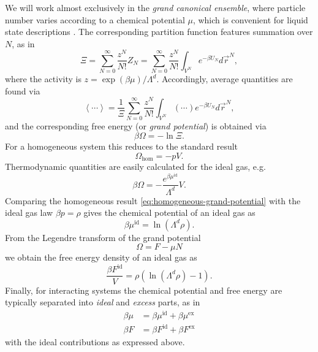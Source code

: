 We will work almost exclusively in the \emph{grand canonical ensemble}, where particle number varies according to a chemical potential $\mu$, which is convenient for liquid state descriptions%
.
The corresponding partition function features summation over $N$, as in
\begin{equation}\label{eq:grand-canonical-partition}
  \Xi
  =
  \sum_{N=0}^\infty \frac{z^N}{N!} Z_N
  =
  \sum_{N=0}^\infty \frac{z^N}{N!}
  \int_{V^N} e^{-\beta U_N} d\vec{r}^N,
\end{equation}
where the activity is $z = \exp{(\beta\mu)} / \Lambda^d$.
Accordingly, average quantities are found via
\begin{equation}\label{eq:grand-canonical-average}
  \left< \cdots \right>
  =
  \frac{1}{\Xi} \sum_{N=0}^\infty \frac{z^N}{N!}
  \int_{V^N} \left(\cdots\right) e^{-\beta U_N} d\vec{r}^N,
\end{equation}
and the corresponding free energy (or \emph{grand potential}) is obtained via
\begin{equation*}
  \beta \Omega = -\ln{\Xi}.
\end{equation*}
For a homogeneous system this reduces to the standard result
\begin{equation}\label{eq:homogeneous-grand-potential}
  \Omega_\mathrm{hom} = - p V.
\end{equation}
Thermodynamic quantities are easily calculated for the ideal gas, e.g.\
\begin{equation*}
  \beta\Omega = - \frac{e^{\beta\mu^\mathrm{id}}}{\Lambda^d} V.
\end{equation*}
Comparing the homogeneous result \eqref{eq:homogeneous-grand-potential} with the ideal gas law $\beta p = \rho$ gives the chemical potential of an ideal gas as
\begin{equation}\label{eq:ideal-chemical-potential}
  \beta \mu^\mathrm{id} = \ln{(\Lambda^d \rho)}.
\end{equation}
From the Legendre transform of the grand potential
\begin{equation}\label{eq:grand-potential-legendre-transform}
  \Omega = F - \mu N
\end{equation}
we obtain the free energy density of an ideal gas as
\begin{equation}\label{eq:ideal-free-energy-density}
  \frac{\beta F^\mathrm{id}}{V} = \rho (\ln{(\Lambda^d \rho)} - 1).
\end{equation}
Finally, for interacting systems the chemical potential and free energy are typically separated into \emph{ideal} and \emph{excess} parts, as in
\begin{align*}
  \beta \mu &= \beta \mu^\mathrm{id} + \beta \mu^\mathrm{ex} \\
  \beta F &= \beta F^\mathrm{id} + \beta F^\mathrm{ex}
\end{align*}
with the ideal contributions as expressed above.

